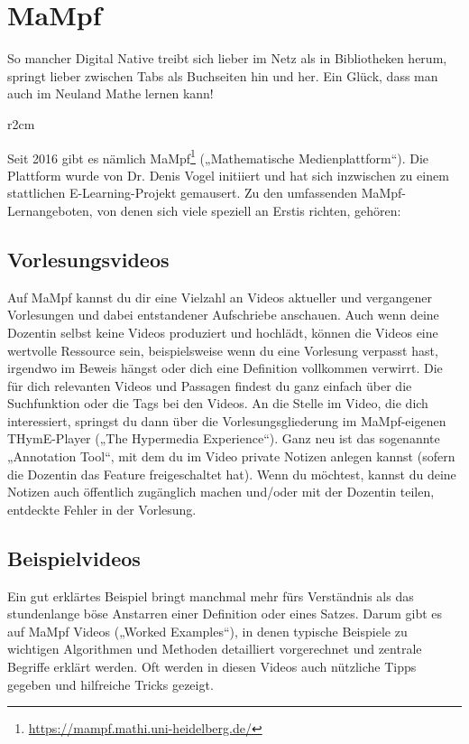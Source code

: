 
\section{MaMpf}
\label{mampf}

\noindent So mancher Digital Native treibt sich lieber im Netz als in Bibliotheken herum, springt lieber zwischen Tabs als Buchseiten hin und her. Ein Glück, dass man auch im Neuland Mathe lernen kann!

\begin{wrapfigure}[7]{r}{2cm}
\vspace{-3mm} %
\hspace*{-7mm}
\end{wrapfigure}

Seit 2016 gibt es nämlich MaMpf\footnote{\url{https://mampf.mathi.uni-heidelberg.de/}} („Mathematische Medienplattform“). Die Plattform wurde von Dr. Denis Vogel initiiert und hat sich inzwischen zu einem stattlichen E-Learning-Projekt gemausert. Zu den umfassenden MaMpf-Lernangeboten, von denen sich viele speziell an Erstis richten, gehören: 
 
\subsection{Vorlesungsvideos}
Auf MaMpf kannst du dir eine Vielzahl an Videos aktueller und vergangener Vorlesungen und dabei entstandener Aufschriebe anschauen. Auch wenn deine Dozentin selbst keine Videos produziert und hochlädt, können die Videos eine wertvolle Ressource sein, beispielsweise wenn du eine Vorlesung verpasst hast, irgendwo im Beweis hängst oder dich eine Definition vollkommen verwirrt. Die für dich relevanten Videos und Passagen findest du ganz einfach über die Suchfunktion oder die Tags bei den Videos. An die Stelle im Video, die dich interessiert, springst du dann über die Vorlesungsgliederung im MaMpf-eigenen THymE-Player („The Hypermedia Experience“). Ganz neu ist das sogenannte „Annotation Tool“, mit dem du im Video private Notizen anlegen kannst (sofern die Dozentin das Feature freigeschaltet hat). Wenn du möchtest, kannst du deine Notizen auch öffentlich zugänglich machen und/oder mit der Dozentin teilen, \zB entdeckte Fehler in der Vorlesung.

\subsection{Beispielvideos}
Ein gut erklärtes Beispiel bringt manchmal mehr fürs Verständnis als das stundenlange böse Anstarren einer Definition oder eines Satzes. Darum gibt es auf MaMpf Videos („Worked Examples“), in denen typische Beispiele zu wichtigen Algorithmen und Methoden detailliert vorgerechnet und zentrale Begriffe erklärt werden. Oft werden in diesen Videos auch nützliche Tipps gegeben und hilfreiche Tricks gezeigt.


